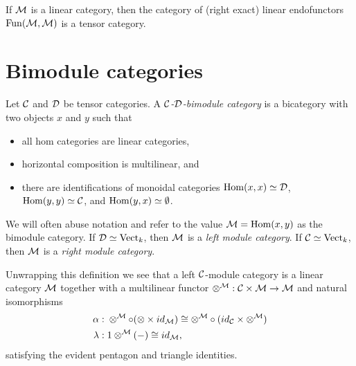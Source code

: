 \documentclass{amsart}
\begin{document}
\begin{example}
	If $\mathcal M$ is a linear category, then the category of (right exact) linear endofunctors $\operatorname{Fun}(\mathcal M, \mathcal M)$ is a tensor category. 
\end{example}



\section{Bimodule categories} \label{sec-tc-bimodcat}

\begin{definition}
	Let $\mathcal C$ and $\mathcal D$ be tensor categories. A {\em $\mathcal C$-$\mathcal D$-bimodule category} is a bicategory with two objects $x$ and $y$ such that
	\begin{itemize}
		\item all hom categories are linear categories, 
		\item horizontal composition is multilinear, and
		\item there are identifications of monoidal categories $\operatorname{Hom}(x,x) \simeq \mathcal D$, $\operatorname{Hom}(y,y) \simeq \mathcal C$, and $\operatorname{Hom}(y,x) \simeq \emptyset$.
	\end{itemize}
	We will often abuse notation and refer to the value $\mathcal M = \operatorname{Hom}(x,y)$ as the bimodule category. If $\mathcal D \simeq \mathrm{Vect}_k$, then $\mathcal M$ is a {\em left module category}. If $\mathcal C \simeq \mathrm{Vect}_k$, then $\mathcal M$ is a {\em right module category}.
\end{definition}
	
Unwrapping this definition we see that a left $\mathcal C$-module category is a linear category $\mathcal M$ together with a multilinear functor $\otimes^{\mathcal M}: \mathcal C \times \mathcal M \to \mathcal M$ and natural isomorphisms
	\begin{align*}
		\alpha: & \;    \otimes^{\mathcal M} \circ (\otimes \times id_{\mathcal M}) \cong  \otimes^{\mathcal M} \circ (id_{\mathcal C} \times \otimes^{\mathcal M}) \\
		\lambda: & \; 1 \otimes^{\mathcal M}(-) \cong id_{\mathcal M},
	\end{align*}
	satisfying the evident pentagon and triangle identities. 
\end{document}
